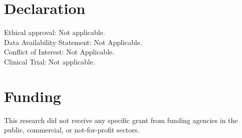 \documentclass[final,1p,times]{elsarticle}
\begin{document}
	\section{Declaration} 
\noindent Ethical approval: Not applicable.\\
Data Availability Statement: Not Applicable.\\
Conflict of Interest: Not Applicable.\\
Clinical Trial: Not applicable.

\section{Funding}

This research did not receive any specific grant from funding agencies in the public, commercial, or not-for-profit sectors.
\end{document}
